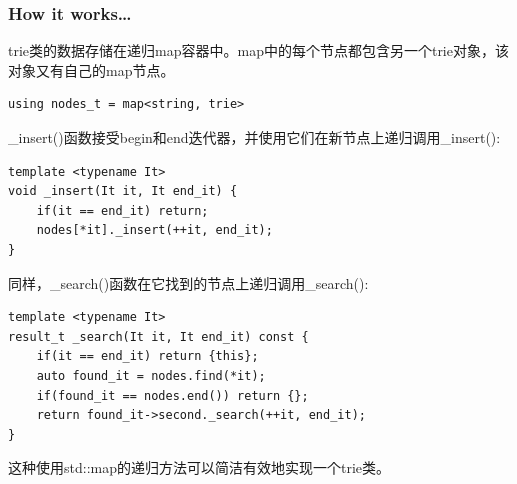 \subsubsection{How it works…}

trie类的数据存储在递归map容器中。map中的每个节点都包含另一个trie对象，该对象又有自己的map节点。

\begin{lstlisting}[style=styleCXX]
using nodes_t = map<string, trie>
\end{lstlisting}

\_insert()函数接受begin和end迭代器，并使用它们在新节点上递归调用\_insert():

\begin{lstlisting}[style=styleCXX]
template <typename It>
void _insert(It it, It end_it) {
	if(it == end_it) return;
	nodes[*it]._insert(++it, end_it);
}
\end{lstlisting}

同样，\_search()函数在它找到的节点上递归调用\_search():

\begin{lstlisting}[style=styleCXX]
template <typename It>
result_t _search(It it, It end_it) const {
	if(it == end_it) return {this};
	auto found_it = nodes.find(*it);
	if(found_it == nodes.end()) return {};
	return found_it->second._search(++it, end_it);
}
\end{lstlisting}

这种使用std::map的递归方法可以简洁有效地实现一个trie类。






























